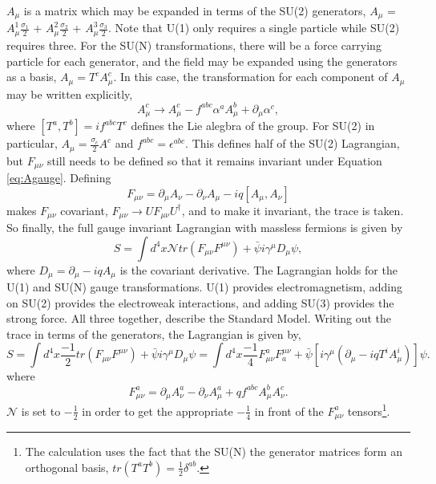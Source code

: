 $A_\mu$ is a matrix which may be expanded in terms of the SU(2) generators, $A_\mu$ = $A^1_{\mu}\frac{\sigma_1}{2}$ + $A^2_{\mu}\frac{\sigma_2}{2}$ + $A^3_{\mu}\frac{\sigma_3}{2}$. Note that U(1) only requires a single particle while SU(2) requires three. For the SU(N) transformations, there will be a force carrying particle for each generator, and the field may be expanded using the generators as a basis, $A_\mu = T^cA^c_\mu$. In this case, the transformation for each component of $A_\mu$ may be written explicitly, 
\begin{equation}
\label{eq:Agauge}
A^c_\mu \rightarrow A^c_\mu - f^{abc}\alpha^a A^b_\mu + \partial_\mu\alpha^c, 
\end{equation}
where $[T^a,T^b]=if^{abc}T^c$ defines the Lie alegbra of the group. For SU(2) in particular, $A_\mu = \frac{\sigma_c}{2}A^c$ and $f^{abc} = \epsilon^{abc}$.
This defines half of the SU(2) Lagrangian, but $F_{\mu\nu}$ still needs to be defined so that it remains invariant under Equation \ref{eq:Agauge}. Defining 
\begin{equation}
F_{\mu\nu} = \partial_\mu A_\nu - \partial_\nu A_\mu - iq[A_\mu,A_\nu] 
\end{equation}
makes $F_{\mu\nu}$ covariant, $F_{\mu\nu} \rightarrow UF_{\mu\nu}U^\dagger$, \cite{zee} and to make it invariant, the trace is taken. So finally, the full gauge invariant Lagrangian with massless fermions is given by
\begin{equation}
S = \int d^4x \mathcal{N}tr(F_{\mu\nu}F^{\mu\nu}) + \bar{\psi}i\gamma^\mu D_\mu\psi,
\end{equation}
where $D_\mu = \partial_\mu - iqA_\mu$ is the covariant derivative. The Lagrangian holds for the U(1) and SU(N) gauge transformations. U(1) provides electromagnetism, adding on SU(2) provides the electroweak interactions, and adding SU(3) provides the strong force. All three together, describe the Standard Model. Writing out the trace in terms of the generators, the Lagrangian is given by, 
\begin{equation}
\label{eq:ewlagrangian}
S = \int d^4x \frac{-1}{2}tr(F_{\mu\nu}F^{\mu\nu}) + \bar{\psi}i\gamma^\mu D_\mu\psi 
  = \int d^4x \frac{-1}{4}F^a_{\mu\nu}F_a^{\mu\nu} + \bar{\psi}\left[i\gamma^\mu\left(\partial_\mu - iqT^iA^i_\mu\right)\right]\psi. 
\end{equation}
where
\begin{equation}
F^a_{\mu\nu} = \partial_\mu A^a_\nu - \partial_\nu A^a_\mu + qf^{abc}A^b_\mu A^c_\nu. 
\end{equation}
$\mathcal{N}$ is set to $-\frac{1}{2}$ in order to get the appropriate $-\frac{1}{4}$ in front of the $F^a_{\mu\nu}$ tensors\footnote{The calculation uses the fact that the SU(N) the generator matrices form an orthogonal basis, $tr(T^aT^b) = \frac{1}{2}\delta^{ab}$.}.

